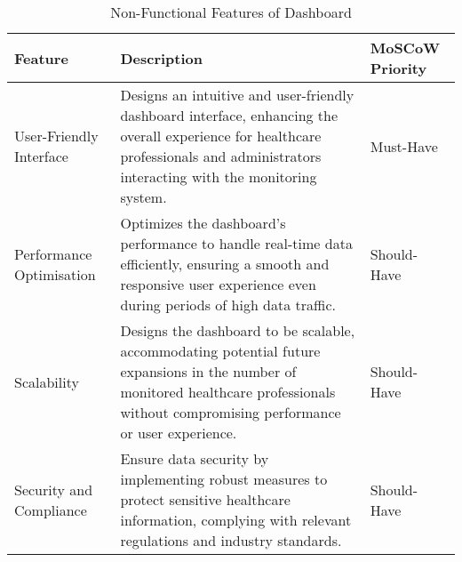 \begin{table}[h]
    \centering
    \begin{tabularx}{\textwidth}{|p{3cm}|X|p{2cm}|}

         \hline

         \textbf{Feature}
         & \textbf{Description}
         & \textbf{MoSCoW Priority} \\ \hline

         User-Friendly Interface
         & Designs an intuitive and user-friendly dashboard interface, enhancing the overall experience for healthcare professionals and administrators interacting with the monitoring system.
         & Must-Have \\ \hline

         Performance Optimisation
         & Optimizes the dashboard's performance to handle real-time data efficiently, ensuring a smooth and responsive user experience even during periods of high data traffic.
         & Should-Have \\ \hline

         Scalability
         & Designs the dashboard to be scalable, accommodating potential future expansions in the number of monitored healthcare professionals without compromising performance or user experience.
         & Should-Have \\ \hline

         Security and Compliance
         & Ensure data security by implementing robust measures to protect sensitive healthcare information, complying with relevant regulations and industry standards.
         & Should-Have \\ \hline

    \end{tabularx}
    \caption{Non-Functional Features of Dashboard}
    \label{table:non-functional-db}
\end{table}